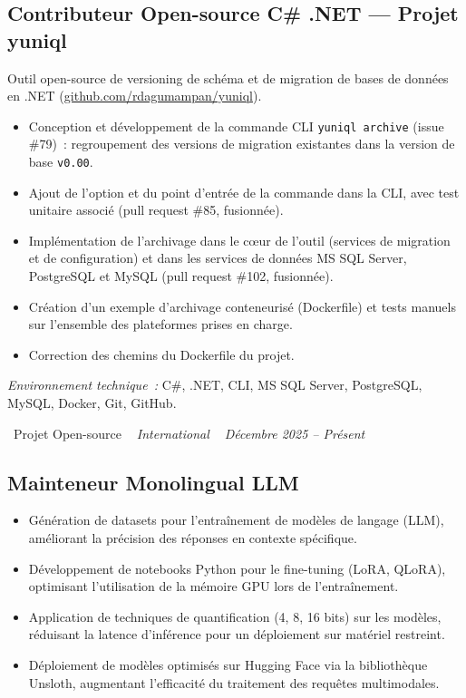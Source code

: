 \documentclass[10pt,a4paper]{article}
\begin{document}
\subsection*{Contributeur Open-source C\# .NET --- Projet yuniql}
\color{darkgray}
Outil open-source de versioning de schéma et de migration de bases de données en .NET (\href{https://github.com/rdagumampan/yuniql}{github.com/rdagumampan/yuniql}).
\begin{itemize}
  \item Conception et développement de la commande CLI \texttt{yuniql archive} (issue \#79)~: regroupement des versions de migration existantes dans la version de base \texttt{v0.00}.
  \item Ajout de l'option et du point d'entrée de la commande dans la CLI, avec test unitaire associé (pull request \#85, fusionnée).
  \item Implémentation de l'archivage dans le cœur de l'outil (services de migration et de configuration) et dans les services de données MS SQL Server, PostgreSQL et MySQL (pull request \#102, fusionnée).
  \item Création d'un exemple d'archivage conteneurisé (Dockerfile) et tests manuels sur l'ensemble des plateformes prises en charge.
  \item Correction des chemins du Dockerfile du projet.
\end{itemize}
\textit{Environnement technique~:} C\#, .NET, CLI, MS SQL Server, PostgreSQL, MySQL, Docker, Git, GitHub.

\vspace{10pt}

\noindent\textcolor{primary}{ \faBuilding\ Projet Open-source} \quad
\textit{ \small \textcolor{darkgray}{ \faMapMarker\ } International } \hfill
\textit{ \small \textcolor{darkgray}{ \faCalendar\ } Décembre 2025 -- Présent }

\vspace{4pt}

\subsection*{Mainteneur Monolingual LLM}
\color{darkgray}
\begin{itemize}
  \item Génération de datasets pour l'entraînement de modèles de langage (LLM), améliorant la précision des réponses en contexte spécifique.
  \item Développement de notebooks Python pour le fine-tuning (LoRA, QLoRA), optimisant l'utilisation de la mémoire GPU lors de l'entraînement.
  \item Application de techniques de quantification (4, 8, 16 bits) sur les modèles, réduisant la latence d'inférence pour un déploiement sur matériel restreint.
  \item Déploiement de modèles optimisés sur Hugging Face via la bibliothèque Unsloth, augmentant l'efficacité du traitement des requêtes multimodales.
\end{itemize}
\end{document}
